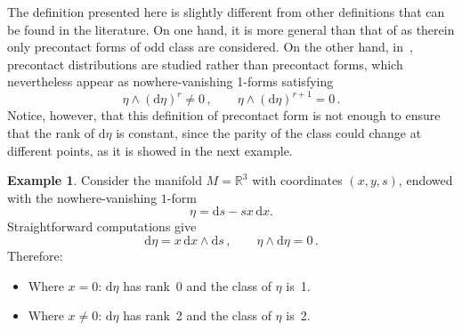 \documentclass[11pt,twoside]{article}
\theoremstyle{plain}
\theoremstyle{definition}
\newtheorem{remark}[theorem]{Remark}
\newtheorem{example}[theorem]{Example}
\renewcommand{\d}{\mathrm{d}}
\newcommand{\T}{{\mathrm T}}
\let\Tan\T
\newcommand*{\inn}[1]{\iota_{#1}}
\def\d{\mathrm{d}}
\def\d{\mathrm{d}}
\def\Ker{\mathrm{Ker \,}}
\def\Tan{\mathrm{T}}
\begin{document}
    

The definition presented here is slightly different from other definitions that can be found in the literature.
On one hand, it is more general than that of 
\cite{LGGMR_23,LL_19a,Lai_22}
as therein only precontact forms of odd class are considered.
On the other hand, 
in~\cite{GG_23},
precontact distributions are studied rather than precontact forms,
which nevertheless appear as 
nowhere-vanishing 1-forms satisfying
$$
\eta \wedge (\d \eta)^r \neq 0\,, \qquad \eta \wedge (\d \eta )^{r+1} = 0\,.
$$
Notice, however,
that this definition of precontact form 
is not enough 
to ensure that the rank of $\d\eta$ is constant, 
since the parity of the class could change at different points,
as it is showed in the next example.

\begin{example}
Consider the manifold $M=\mathbb{R}^3$ with coordinates $(x,y,s)$, endowed with the nowhere-vanishing $1$-form
$$
\eta = \d s - s x \,\d x 
.
$$
Straightforward computations give 
$$
\d\eta = x \,\d x \wedge \d s \,,
\qquad
\eta \wedge \d \eta = 0\,.
$$
Therefore:
\begin{itemize}
\item
Where $x=0$: $\d\eta$ has rank~0 and the class of $\eta$ is~1.
\item
Where $x\neq 0$: $\d\eta$ has rank~2 and the class of $\eta$ is~2.
\end{itemize}

\end{example}
\end{document}
